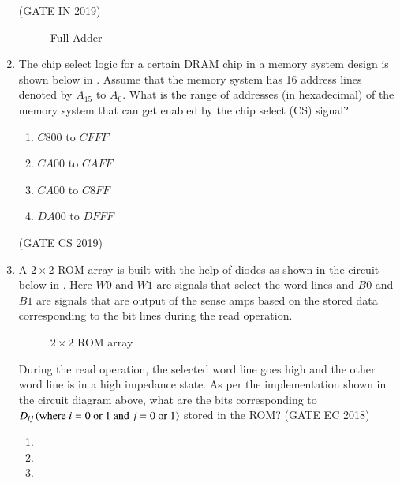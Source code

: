 \begin{enumerate}[label=\arabic*.,ref=\theenumi]
	               \hfill(GATE IN 2019)
\begin{figure}[H] 
    \centering
    \resizebox{0.75\columnwidth}{!}{%
	
	}
	\caption{Full Adder}
	\label{fig:GATE-IN2019,22}
\end{figure}
\item  The chip select logic for a certain DRAM chip in a memory system design is shown below
	in
.
	Assume that the memory system has 16 address lines denoted by ${A_{15}}$ to ${A_0}$. What is the range of addresses (in hexadecimal) of the memory system that can get enabled by the chip select (CS) signal?
\begin{enumerate}
\item ${C800}$ to ${CFFF}$
\item ${CA00}$ to ${CAFF}$
\item ${CA00}$ to ${C8FF}$
\item ${DA00}$ to ${DFFF}$
\end{enumerate}  
\hfill (GATE CS 2019)
%
\begin{figure}[H]

\caption{}
\label{fig:figure14}
\end{figure}
%
\item  A $2\times2$ ROM array is built with the help of diodes as shown in the circuit below
	in . Here $W0$ and $W1$ are signals that select the word lines and $B0$ and $B1$ are signals that are output of the sense amps based on the stored data corresponding to the bit lines during the read operation.
%
\begin{figure}[H]
        \centering
	\resizebox{0.75\columnwidth}{!}{%
        
	}
        \caption{ $2\times 2$ ROM array}
	\label{fig:2rom}
\end{figure}
%
		During the read operation, the selected word line goes high and the other word line is in a high impedance state. As per the implementation shown in the circuit diagram above, what are the bits corresponding to $D_{ij}\left(\text{where $i=0$ or $1$ and $j=0$ or $1$}\right)$ stored in the ROM?
	\hfill(GATE EC 2018)
	\begin{multicols}{4}
\begin{enumerate}
    \item {}
    \item {}
    \item {}    

\end{enumerate}
\end{multicols}
\end{enumerate}

